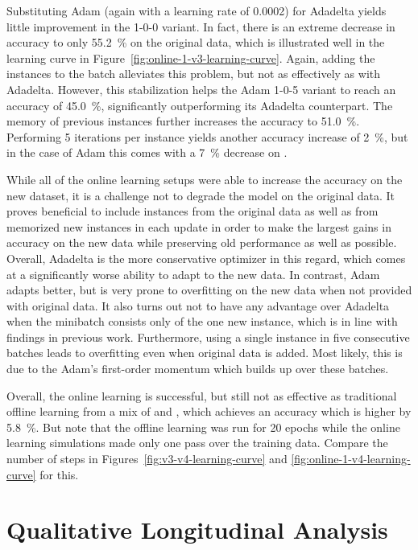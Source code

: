 Substituting Adam (again with a learning rate of \num{0.0002}) for Adadelta
yields little improvement in the 1-0-0 variant. In fact, there is an extreme
decrease in accuracy to only \SI{55.2}{\%} on the original \nlmthree{} data,
which is illustrated well in the learning curve in
Figure~\ref{fig:online-1-v3-learning-curve}. Again, adding the \nlmthree{}
instances to the batch alleviates this problem, but not as effectively as with
Adadelta. However, this stabilization helps the Adam 1-0-5 variant to reach an
\nlmfour{} accuracy of \SI{45.0}{\%}, significantly outperforming its Adadelta
counterpart. The memory of previous \nlmfour{} instances further increases the
accuracy to \SI{51.0}{\%}. Performing 5 iterations per instance yields
another accuracy increase of \SI{2}{\%}, but in the case of Adam this comes with
a \SI{7}{\%} decrease on \nlmthree{}.

While all of the online learning setups were able to increase the accuracy on
the new \nlmapsfour{} dataset, it is a challenge not to degrade the model on the
original data. It proves beneficial to include instances from the original data
as well as from memorized new instances in each update in order to make the
largest gains in accuracy on the new data while preserving old performance as
well as possible. Overall, Adadelta is the more conservative optimizer in this
regard, which comes at a significantly worse ability to adapt to the new data.
In contrast, Adam adapts better, but is very prone to overfitting on the new
data when not provided with original data. It also turns out not to have any
advantage over Adadelta when the minibatch consists only of the one new
instance, which is in line with findings in previous work. Furthermore, using a
single instance in five consecutive batches leads to overfitting even when
original data is added. Most likely, this is due to the Adam’s first-order
momentum which builds up over these batches.

Overall, the online learning is successful, but still not as effective as
traditional offline learning from a mix of \nlmthree{} and \nlmfour{}, which
achieves an accuracy which is higher by \SI{5.8}{\%}. But note that the offline
learning was run for \num{20} epochs while the online learning simulations made
only one pass over the training data. Compare the number of steps in
Figures~\ref{fig:v3-v4-learning-curve} and \ref{fig:online-1-v4-learning-curve}
for this.

\FloatBarrier
\section{Qualitative Longitudinal Analysis}

